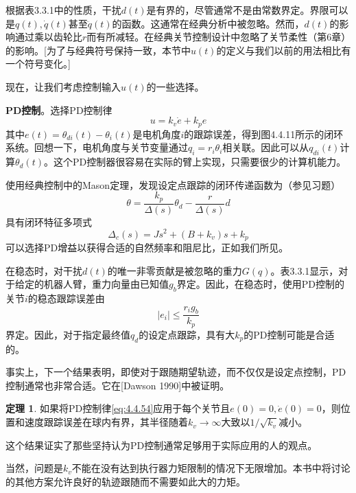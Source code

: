 \documentclass[UTF8]{ctexart}
\theoremstyle{definition}
\newtheorem{theorem}{定理}[section]
\begin{document}
根据表3.3.1中的性质，干扰$d(t)$是有界的，尽管通常不是由常数界定。界限可以是$q(t), \dot{q}(t)$甚至$\ddot{q}(t)$的函数。这通常在经典分析中被忽略。然而，$d(t)$的影响通过乘以齿轮比$r$而有所减轻。在经典关节控制设计中忽略了关节柔性（第6章）的影响。[为了与经典符号保持一致，本节中$u(t)$的定义与我们以前的用法相比有一个符号变化。]

现在，让我们考虑控制输入$u(t)$的一些选择。

\textbf{PD控制}。选择PD控制律
\begin{equation}\label{eq:4.4.54}
    u = k_v\dot{e} + k_pe
\end{equation}
其中$e(t) = \theta_{di}(t) - \theta_i(t)$是电机角度$i$的跟踪误差，得到图4.4.11所示的闭环系统。回想一下，电机角度与关节变量通过$q_i = r_i\theta_i$相关联。因此可以从$q_{di}(t)$计算$\theta_d(t)$。这个PD控制器很容易在实际的臂上实现，只需要很少的计算机能力。

使用经典控制中的Mason定理，发现设定点跟踪的闭环传递函数为（参见习题）
\begin{equation}\label{eq:4.4.55}
    \theta = \frac{k_p}{\Delta(s)}\theta_d - \frac{r}{\Delta(s)}d
\end{equation}
具有闭环特征多项式
\begin{equation}\label{eq:4.4.56}
    \Delta_c(s) = Js^2 + (B + k_v)s + k_p
\end{equation}
可以选择PD增益以获得合适的自然频率和阻尼比，正如我们所见。

在稳态时，对干扰$d(t)$的唯一非零贡献是被忽略的重力$G(q)$。表3.3.1显示，对于给定的机器人臂，重力向量由已知值$g_b$界定。因此，在稳态时，使用PD控制的关节$i$的稳态跟踪误差由
\begin{equation}\label{eq:4.4.57}
    |e_i| \leq \frac{r_i g_b}{k_p}
\end{equation}
界定。因此，对于指定最终值$q_d$的设定点跟踪，具有大$k_p$的PD控制可能是合适的。

事实上，下一个结果表明，即使对于跟随期望轨迹，而不仅仅是设定点控制，PD控制通常也非常合适。它在[Dawson 1990]中被证明。

\begin{theorem}
如果将PD控制律\eqref{eq:4.4.54}应用于每个关节且$e(0) = 0, \dot{e}(0) = 0$，则位置和速度跟踪误差在球内有界，其半径随着$k_v \to \infty$大致以$1/\sqrt{k_v}$减小。
\end{theorem}

这个结果证实了那些坚持认为PD控制通常足够用于实际应用的人的观点。

当然，问题是$k_v$不能在没有达到执行器力矩限制的情况下无限增加。本书中将讨论的其他方案允许良好的轨迹跟随而不需要如此大的力矩。
\end{document}
